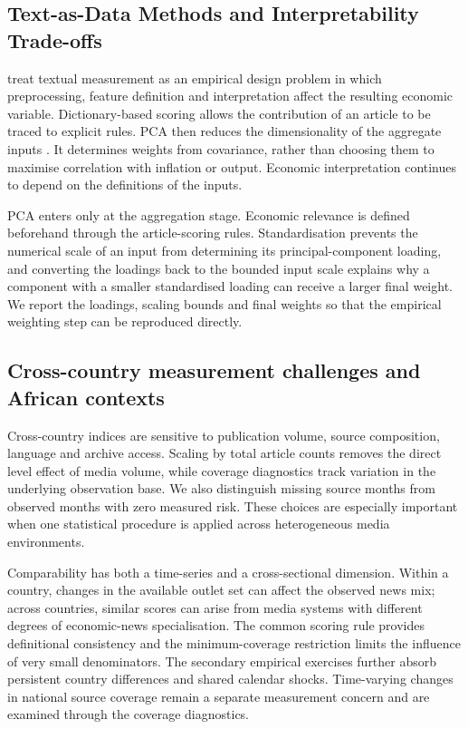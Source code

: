 \documentclass[12pt]{article}
\begin{document}
\subsection{Text-as-Data Methods and Interpretability Trade-offs}
\citet{gentzkow2019} treat textual measurement as an empirical design problem in which preprocessing, feature definition and interpretation affect the resulting economic variable. Dictionary-based scoring allows the contribution of an article to be traced to explicit rules. PCA then reduces the dimensionality of the aggregate inputs \citep{jolliffe2016}. It determines weights from covariance, rather than choosing them to maximise correlation with inflation or output. Economic interpretation continues to depend on the definitions of the inputs.

PCA enters only at the aggregation stage. Economic relevance is defined beforehand through the article-scoring rules. Standardisation prevents the numerical scale of an input from determining its principal-component loading, and converting the loadings back to the bounded input scale explains why a component with a smaller standardised loading can receive a larger final weight. We report the loadings, scaling bounds and final weights so that the empirical weighting step can be reproduced directly.
\subsection{Cross-country measurement challenges and African contexts}
Cross-country indices are sensitive to publication volume, source composition, language and archive access. Scaling by total article counts removes the direct level effect of media volume, while coverage diagnostics track variation in the underlying observation base. We also distinguish missing source months from observed months with zero measured risk. These choices are especially important when one statistical procedure is applied across heterogeneous media environments.

Comparability has both a time-series and a cross-sectional dimension. Within a country, changes in the available outlet set can affect the observed news mix; across countries, similar scores can arise from media systems with different degrees of economic-news specialisation. The common scoring rule provides definitional consistency and the minimum-coverage restriction limits the influence of very small denominators. The secondary empirical exercises further absorb persistent country differences and shared calendar shocks. Time-varying changes in national source coverage remain a separate measurement concern and are examined through the coverage diagnostics.
\end{document}
